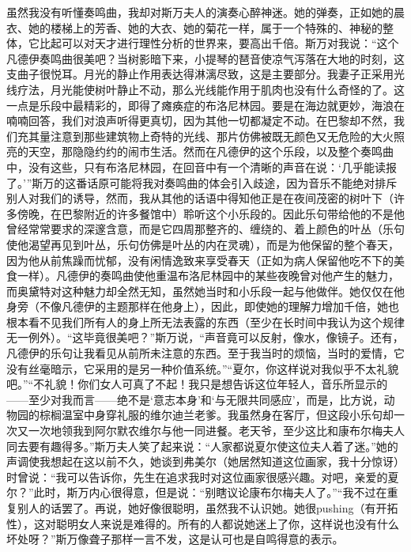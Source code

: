 \par 虽然我没有听懂奏鸣曲，我却对斯万夫人的演奏心醉神迷。她的弹奏，正如她的晨衣、她的楼梯上的芳香、她的大衣、她的菊花一样，属于一个特殊的、神秘的整体，它比起可以对天才进行理性分析的世界来，要高出千倍。斯万对我说：“这个凡德伊奏鸣曲很美吧？当树影暗下来，小提琴的琶音使凉气泻落在大地的时刻，这支曲子很悦耳。月光的静止作用表达得淋漓尽致，这是主要部分。我妻子正采用光线疗法，月光能使树叶静止不动，那么光线能作用于肌肉也没有什么奇怪的了。这一点是乐段中最精彩的，即得了瘫痪症的布洛尼林园。要是在海边就更妙，海浪在喃喃回答，我们对浪声听得更真切，因为其他一切都凝定不动。在巴黎却不然，我们充其量注意到那些建筑物上奇特的光线、那片仿佛被既无颜色又无危险的大火照亮的天空，那隐隐约约的闹市生活。然而在凡德伊的这个乐段，以及整个奏鸣曲中，没有这些，只有布洛尼林园，在回音中有一个清晰的声音在说：‘几乎能读报了。’”斯万的这番话原可能将我对奏鸣曲的体会引入歧途，因为音乐不能绝对排斥别人对我们的诱导，然而，我从其他的话语中得知他正是在夜间茂密的树叶下（许多傍晚，在巴黎附近的许多餐馆中）聆听这个小乐段的。因此乐句带给他的不是他曾经常常要求的深邃含意，而是它四周那整齐的、缠绕的、着上颜色的叶丛（乐句使他渴望再见到叶丛，乐句仿佛是叶丛的内在灵魂），而是为他保留的整个春天，因为他从前焦躁而忧郁，没有闲情逸致来享受春天（正如为病人保留他吃不下的美食一样）。凡德伊的奏鸣曲使他重温布洛尼林园中的某些夜晚曾对他产生的魅力，而奥黛特对这种魅力却全然无知，虽然她当时和小乐段一起与他做伴。她仅仅在他身旁（不像凡德伊的主题那样在他身上），因此，即使她的理解力增加千倍，她也根本看不见我们所有人的身上所无法表露的东西（至少在长时间中我认为这个规律无一例外）。“这毕竟很美吧？”斯万说，“声音竟可以反射，像水，像镜子。还有，凡德伊的乐句让我看见从前所未注意的东西。至于我当时的烦恼，当时的爱情，它没有丝毫暗示，它采用的是另一种价值系统。”“夏尔，你这样说对我似乎不太礼貌吧。”“不礼貌！你们女人可真了不起！我只是想告诉这位年轻人，音乐所显示的——至少对我而言——绝不是‘意志本身’和‘与无限共同感应’，而是，比方说，动物园的棕榈温室中身穿礼服的维尔迪兰老爹。我虽然身在客厅，但这段小乐句却一次又一次地领我到阿尔默农维尔与他一同进餐。老天爷，至少这比和康布尔梅夫人同去要有趣得多。”斯万夫人笑了起来说：“人家都说夏尔使这位夫人着了迷。”她的声调使我想起在这以前不久，她谈到弗美尔（她居然知道这位画家，我十分惊讶）时曾说：“我可以告诉你，先生在追求我时对这位画家很感兴趣。对吧，亲爱的夏尔？”此时，斯万内心很得意，但是说：“别瞎议论康布尔梅夫人了。”“我不过在重复别人的话罢了。再说，她好像很聪明，虽然我不认识她。她很pushing（有开拓性），这对聪明女人来说是难得的。所有的人都说她迷上了你，这样说也没有什么坏处呀？”斯万像聋子那样一言不发，这是认可也是自鸣得意的表示。
